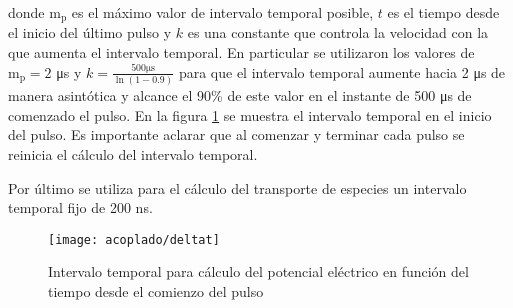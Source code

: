 donde $\mathrm{m_p}$ es el máximo valor de intervalo temporal posible, $t$ es el tiempo desde el inicio del último pulso y $k$ es una constante que controla la velocidad con la que aumenta el intervalo temporal. En particular se utilizaron los valores de $\mathrm{m_p} = 2$ \si{\micro\second} y $k = \frac{500 \si{\micro\second}}{\ln (1 - 0.9)}$ para que el intervalo temporal aumente hacia 2 \si{\micro\second} de manera asintótica y alcance el 90\% de este valor en el instante de 500 \si{\micro\second} de comenzado el pulso. En la figura \ref{fig:deltat} se muestra el intervalo temporal en el inicio del pulso. Es importante aclarar que al comenzar y terminar cada pulso se reinicia el cálculo del intervalo temporal.

Por último se utiliza para el cálculo del transporte de especies un intervalo temporal fijo de 200 \si{\nano\second}.\\

\clearpage

\begin{figure}
	\centering
	\texttt{[image: acoplado/deltat]}
	\caption{Intervalo temporal para cálculo del potencial eléctrico en función del tiempo desde el comienzo del pulso}
	\label{fig:deltat}
\end{figure}





